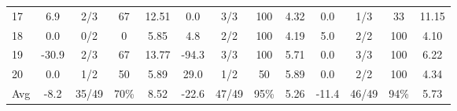 \begin{table}[p]
{\begin{tabular}{l|cccc|cccc|cccc}
17 & 6.9 & 2/3 & 67 & 12.51 & 0.0 & 3/3 & 100 & 4.32 & 0.0 & 1/3 & 33 & 11.15 \\
18 & 0.0 & 0/2 & 0 & 5.85 & 4.8 & 2/2 & 100 & 4.19 & 5.0 & 2/2 & 100 & 4.10 \\
19 & -30.9 & 2/3 & 67 & 13.77 & -94.3 & 3/3 & 100 & 5.71 & 0.0 & 3/3 & 100 & 6.22 \\
20 & 0.0 & 1/2 & 50 & 5.89 & 29.0 & 1/2 & 50 & 5.89 & 0.0 & 2/2 & 100 & 4.34 \\
\midrule
Avg & -8.2 & 35/49 & 70\% & 8.52 & -22.6 & 47/49 & 95\% & 5.26 & -11.4 & 46/49 & 94\% & 5.73 \\
\bottomrule
\end{tabular}%
}
\end{table}
